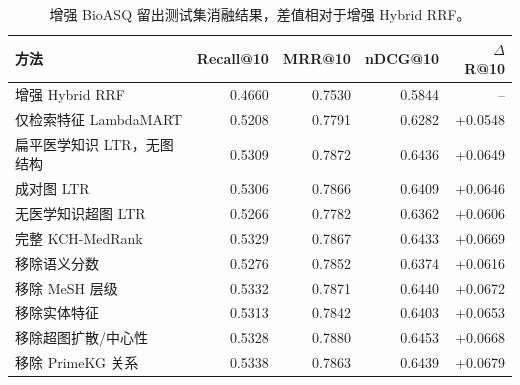 \begin{table}[t]
\centering
\small
\caption{增强 BioASQ 留出测试集消融结果，差值相对于增强 Hybrid RRF。}
\label{tab:kch-ablation-summary}
\begin{tabular}{lrrrr}
\toprule
方法 & Recall@10 & MRR@10 & nDCG@10 & $\Delta$R@10 \\
\midrule
增强 Hybrid RRF & 0.4660 & 0.7530 & 0.5844 & -- \\
仅检索特征 LambdaMART & 0.5208 & 0.7791 & 0.6282 & +0.0548 \\
扁平医学知识 LTR，无图结构 & 0.5309 & 0.7872 & 0.6436 & +0.0649 \\
成对图 LTR & 0.5306 & 0.7866 & 0.6409 & +0.0646 \\
无医学知识超图 LTR & 0.5266 & 0.7782 & 0.6362 & +0.0606 \\
完整 KCH-MedRank & 0.5329 & 0.7867 & 0.6433 & +0.0669 \\
移除语义分数 & 0.5276 & 0.7852 & 0.6374 & +0.0616 \\
移除 MeSH 层级 & 0.5332 & 0.7871 & 0.6440 & +0.0672 \\
移除实体特征 & 0.5313 & 0.7842 & 0.6403 & +0.0653 \\
移除超图扩散/中心性 & 0.5328 & 0.7880 & 0.6453 & +0.0668 \\
移除 PrimeKG 关系 & 0.5338 & 0.7863 & 0.6439 & +0.0679 \\
\bottomrule
\end{tabular}
\end{table}
